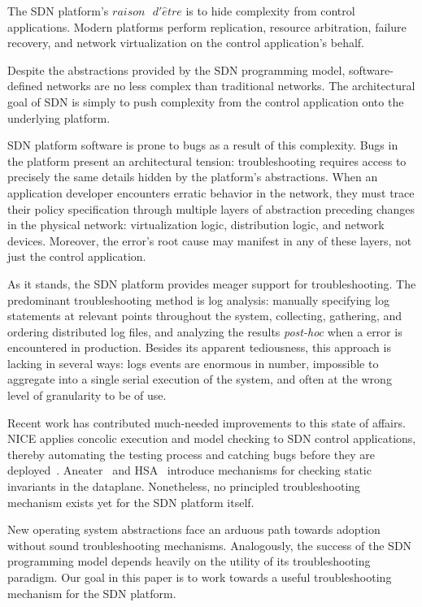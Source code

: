 The SDN platform's $raison\text{ }d'\hat{e}tre$ is to 
hide complexity from control applications. Modern platforms perform
replication, resource arbitration, failure recovery, and network 
virtualization on the control application's behalf. 

Despite the abstractions provided by the SDN programming model,
software-defined networks are no less complex than traditional networks. The architectural goal of SDN is
simply to push complexity from the control application onto the underlying platform.

SDN platform software is prone to bugs as a result of this complexity. Bugs in the
platform present an architectural tension: troubleshooting requires
access to precisely the same details hidden by the platform's abstractions.
When an application developer 
encounters erratic behavior in the network, they must trace their
policy specification through multiple layers of abstraction
preceding changes in the physical network: virtualization logic,
distribution logic, and network devices. Moreover, the error's root cause
may manifest in any of these layers, not just the control application.

As it stands, the SDN platform provides meager support for troubleshooting.
The predominant troubleshooting method is log analysis: manually
specifying log statements at relevant points throughout the system,
collecting, gathering, and ordering distributed log files, and analyzing the
results {\it post-hoc} when a error is encountered in production. Besides its
apparent tediousness, this approach is lacking in several ways: logs events
are enormous in number, impossible to aggregate into a single serial
execution of the system, and often at the wrong level of granularity to be of
use. 

Recent work has contributed much-needed improvements to this state of affairs. 
NICE applies concolic execution and model checking to SDN control
applications, thereby automating the testing process and catching bugs before
they are deployed~\cite{nice}. Aneater~\cite{anteater} and HSA~\cite{hsa}
introduce mechanisms for checking static invariants in the dataplane.
Nonetheless, no principled troubleshooting mechanism exists yet for the SDN platform itself.

New operating system abstractions face an arduous path towards adoption
without sound troubleshooting mechanisms. Analogously, the success of the
SDN programming model depends heavily on the utility of its troubleshooting
paradigm. Our goal in this paper is to work towards a useful
troubleshooting mechanism for the SDN platform. 

